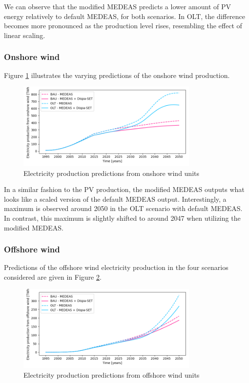 We can observe that the modified MEDEAS predicts a lower amount of PV energy relatively to default MEDEAS, for both scenarios. In OLT, the difference becomes more pronounced as the production level rises, resembling the effect of linear scaling.

\subsubsection{Onshore wind}

Figure \ref{fig:electricity-production-onshore} illustrates the varying predictions of the onshore wind production.

\begin{figure}[h]
    \centering
    \includegraphics[width=0.8\textwidth]{resources/images/electricity-production-onshore.png}
    \caption{Electricity production predictions from onshore wind units}
    \label{fig:electricity-production-onshore}
\end{figure}

In a similar fashion to the PV production, the modified MEDEAS outputs what looks like a scaled version of the default MEDEAS output. Interestingly, a maximum is observed around 2050 in the OLT scenario with default MEDEAS. In contrast, this maximum is slightly shifted to around 2047 when utilizing the modified MEDEAS. 

\subsubsection{Offshore wind}

Predictions of the offshore wind electricity production in the four scenarios considered are given in Figure \ref{fig:electricity-production-offshore}.

\begin{figure}[h]
    \centering
    \includegraphics[width=0.8\textwidth]{resources/images/electricity-production-offshore.png}
    \caption{Electricity production predictions from offshore wind units}
    \label{fig:electricity-production-offshore}
\end{figure}

